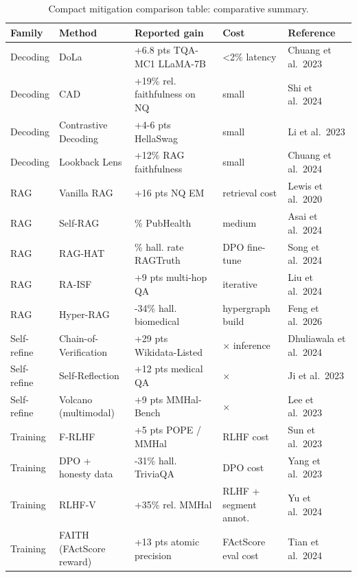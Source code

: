 \documentclass{article}
\begin{document}
\begin{table}[t]
\centering
\caption{Compact mitigation comparison table: comparative summary.}
\label{tab:compact-mitigation-comparison-table}
\begin{tabular}{>{\raggedright\arraybackslash}p{0.1038\linewidth}
  >{\raggedright\arraybackslash}p{0.2264\linewidth}
  >{\raggedright\arraybackslash}p{0.2642\linewidth}
  >{\raggedright\arraybackslash}p{0.1981\linewidth}
  >{\raggedright\arraybackslash}p{0.2075\linewidth}}
\toprule
Family & Method & Reported gain & Cost & Reference \\
\midrule
Decoding & DoLa & +6.8 pts TQA-MC1 LLaMA-7B & \textless2\% latency & Chuang et al.~2023 \\
Decoding & CAD & +19\% rel. faithfulness on NQ & small & Shi et al.~2024 \\
Decoding & Contrastive Decoding & +4-6 pts HellaSwag & small & Li et al.~2023 \\
Decoding & Lookback Lens & +12\% RAG faithfulness & small & Chuang et al.~2024 \\
RAG & Vanilla RAG & +16 pts NQ EM & retrieval cost & Lewis et al.~2020 \\
RAG & Self-RAG & 73.5\% PubHealth & medium & Asai et al.~2024 \\
RAG & RAG-HAT & -53\% hall. rate RAGTruth & DPO fine-tune & Song et al.~2024 \\
RAG & RA-ISF & +9 pts multi-hop QA & iterative & Liu et al.~2024 \\
RAG & Hyper-RAG & -21-34\% hall. biomedical & hypergraph build & Feng et al.~2026 \\
Self-refine & Chain-of-Verification & +29 pts Wikidata-Listed & 3× inference & Dhuliawala et al.~2024 \\
Self-refine & Self-Reflection & +12 pts medical QA & 2× & Ji et al.~2023 \\
Self-refine & Volcano (multimodal) & +9 pts MMHal-Bench & 3× & Lee et al.~2023 \\
Training & F-RLHF & +5 pts POPE / MMHal & RLHF cost & Sun et al.~2023 \\
Training & DPO + honesty data & -24-31\% hall. TriviaQA & DPO cost & Yang et al.~2023 \\
Training & RLHF-V & +35\% rel. MMHal & RLHF + segment annot. & Yu et al.~2024 \\
Training & FAITH (FActScore reward) & +13 pts atomic precision & FActScore eval cost & Tian et al.~2024 \\
\end{tabular}
\end{table}
\end{document}
